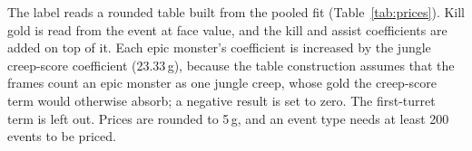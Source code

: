 The label reads a rounded table built from the pooled fit (Table~\ref{tab:prices}). Kill gold is
read from the event at face value, and the kill and assist coefficients are added on top of it.
Each epic monster's coefficient is increased by the jungle creep-score coefficient (23.33\,g), because
the table construction assumes that the frames count an epic monster as one jungle creep, whose gold
the creep-score term would otherwise absorb; a negative result is set to zero. The first-turret term
is left out. Prices are rounded to 5\,g, and an event type needs at least 200 events to be priced.

